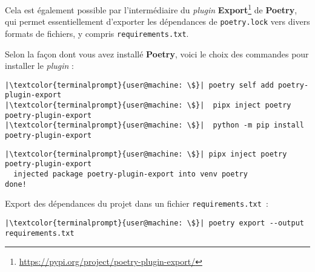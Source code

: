 Cela est également possible par l'intermédiaire du \textit{plugin} \textbf{Export}\footnote{\url{https://pypi.org/project/poetry-plugin-export/}} de \textbf{Poetry}, qui permet essentiellement d’exporter les dépendances de \texttt{poetry.lock} vers divers formats de fichiers, y compris \texttt{requirements.txt}.

Selon la façon dont vous avez installé \textbf{Poetry}, voici le choix des commandes pour installer le \textit{plugin} :
\begin{lstlisting}[style=terminal]
|\textcolor{terminalprompt}{user@machine: \$}| poetry self add poetry-plugin-export
|\textcolor{terminalprompt}{user@machine: \$}|  pipx inject poetry poetry-plugin-export
|\textcolor{terminalprompt}{user@machine: \$}|  python -m pip install poetry-plugin-export
\end{lstlisting}

\begin{lstlisting}[style=terminal]
|\textcolor{terminalprompt}{user@machine: \$}| pipx inject poetry poetry-plugin-export
  injected package poetry-plugin-export into venv poetry
done! 
\end{lstlisting}

Export des dépendances du projet dans un fichier \texttt{requirements.txt} :
\begin{lstlisting}[style=terminal]
|\textcolor{terminalprompt}{user@machine: \$}| poetry export --output requirements.txt
\end{lstlisting}

